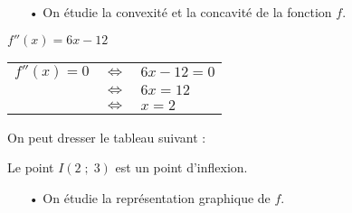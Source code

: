 \newpage

\begin{itemize}
\item[•] On étudie la convexité et la concavité de la fonction $f$. \\
\end{itemize}

$f''(x) = 6x - 12$ \\

\begin{tabular}{lll}
$f''(x) = 0$ & $\Longleftrightarrow$ & $6x - 12 = 0$ \\
& $\Longleftrightarrow$ & $6x = 12$ \\
& $\Longleftrightarrow$ & $x = 2$ \\
\end{tabular}

\vspace*{.3cm}

On peut dresser le tableau suivant : \\


\vspace*{.3cm}

Le point $I\left(2 \; ; \; 3\right)$ est un point d'inflexion. 

\vspace*{.3cm}

\begin{itemize}
\item[•] On étudie la représentation graphique de $f$. \\
\end{itemize}

